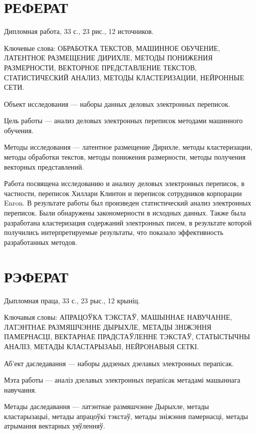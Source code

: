 \chapter*{РЕФЕРАТ}

Дипломная работа, 33 с., 23 рис., 12 источников.

Ключевые слова: ОБРАБОТКА ТЕКСТОВ, МАШИННОЕ ОБУЧЕНИЕ, ЛАТЕНТНОЕ РАЗМЕЩЕНИЕ ДИРИХЛЕ, МЕТОДЫ ПОНИЖЕНИЯ РАЗМЕРНОСТИ, ВЕКТОРНОЕ ПРЕДСТАВЛЕНИЕ ТЕКСТОВ, СТАТИСТИЧЕСКИЙ АНАЛИЗ, МЕТОДЫ КЛАСТЕРИЗАЦИИ, НЕЙРОННЫЕ СЕТИ.

\vspace{1.5 ex}
Объект исследования --- наборы данных деловых электронных переписок. 

Цель работы --- анализ деловых электронных переписок методами машинного обучения.

Методы исследования --- латентное размещение Дирихле, методы кластеризации, методы обработки текстов, методы понижения размерности, методы получения векторных представлений.

Работа посвящена исследованию и анализу деловых электронных переписок, в частности, переписок Хиллари Клинтон и переписок сотрудников корпорации Enron. В результате работы был произведен статистический анализ электронных переписок. Были обнаружены закономерности в исходных данных. Также была разработана кластеризация содержаний электронных писем, в результате которой получились интерпретируемые результаты, что показало эффективность разработанных методов.
 


\chapter*{РЭФЕРАТ}

Дыпломная праца, 33 с., 23 рыс., 12 крыніц.

Ключавыя словы: АПРАЦОЎКА ТЭКСТАЎ, МАШЫННАЕ НАВУЧАННЕ, ЛАТЭНТНАЕ РАЗМЯШЧЭННЕ ДЫРЫХЛЕ, МЕТАДЫ ЗНІЖЭННЯ ПАМЕРНАСЦІ, ВЕКТАРНАЕ ПРАДСТАЎЛЕННЕ ТЭКСТАЎ, СТАТЫСТЫЧНЫ АНАЛІЗ, МЕТАДЫ КЛАСТАРЫЗАЫІ, НЕЙРОНАВЫЯ СЕТКІ.

Аб'ект даследавання --- наборы дадзеных дзелавых электронных перапісак.

Мэта работы --- аналіз дзелавых электронных перапісак метадамі машыннага навучання.

Метады даследавання --- латэнтнае размяшчэнне Дырыхле, метады кластарызацыі, метады апрацоўкі тэкстаў, метады зніжэння памернасці, метады атрымання вектарных уяўленняў.

